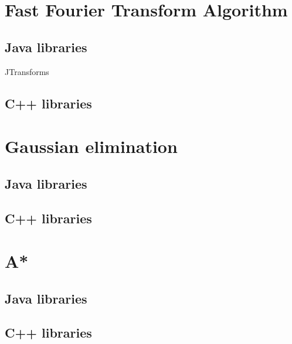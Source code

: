 \section{Fast Fourier Transform Algorithm}

\subsection{Java libraries}
JTransforms\cite{jtransforms:benchmark}

\subsection{C++ libraries}
\cite{FFTW05}

\section{Gaussian elimination}

\subsection{Java libraries}
\subsection{C++ libraries}

\section{A*}

\subsection{Java libraries}
\subsection{C++ libraries}
